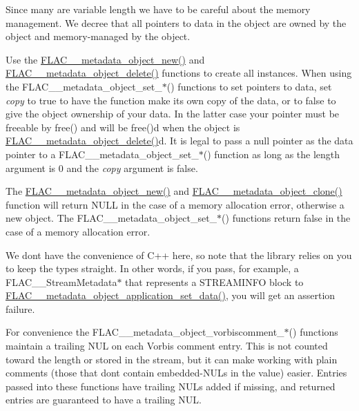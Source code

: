 Since many are variable length we have to be careful about the memory management. We decree that all pointers to data in the object are owned by the object and memory-\/managed by the object.

Use the \hyperlink{group__flac__metadata__object_ga0d21a62648d8c5321b4b47f8ee5a52f0}{F\+L\+A\+C\+\_\+\+\_\+metadata\+\_\+object\+\_\+new()} and \hyperlink{group__flac__metadata__object_ga66bbe27dba68ba77be5af83986a280ea}{F\+L\+A\+C\+\_\+\+\_\+metadata\+\_\+object\+\_\+delete()} functions to create all instances. When using the F\+L\+A\+C\+\_\+\+\_\+metadata\+\_\+object\+\_\+set\+\_\+$\ast$() functions to set pointers to data, set {\itshape copy} to {\ttfamily true} to have the function make it\textquotesingle{}s own copy of the data, or to {\ttfamily false} to give the object ownership of your data. In the latter case your pointer must be freeable by free() and will be free()d when the object is \hyperlink{group__flac__metadata__object_ga66bbe27dba68ba77be5af83986a280ea}{F\+L\+A\+C\+\_\+\+\_\+metadata\+\_\+object\+\_\+delete()}d. It is legal to pass a null pointer as the data pointer to a F\+L\+A\+C\+\_\+\+\_\+metadata\+\_\+object\+\_\+set\+\_\+$\ast$() function as long as the length argument is 0 and the {\itshape copy} argument is {\ttfamily false}.

The \hyperlink{group__flac__metadata__object_ga0d21a62648d8c5321b4b47f8ee5a52f0}{F\+L\+A\+C\+\_\+\+\_\+metadata\+\_\+object\+\_\+new()} and \hyperlink{group__flac__metadata__object_ga16b828b246e9af941e3e616e6bcd74c0}{F\+L\+A\+C\+\_\+\+\_\+metadata\+\_\+object\+\_\+clone()} function will return {\ttfamily N\+U\+LL} in the case of a memory allocation error, otherwise a new object. The F\+L\+A\+C\+\_\+\+\_\+metadata\+\_\+object\+\_\+set\+\_\+$\ast$() functions return {\ttfamily false} in the case of a memory allocation error.

We don\textquotesingle{}t have the convenience of C++ here, so note that the library relies on you to keep the types straight. In other words, if you pass, for example, a F\+L\+A\+C\+\_\+\+\_\+\+Stream\+Metadata$\ast$ that represents a S\+T\+R\+E\+A\+M\+I\+N\+FO block to \hyperlink{group__flac__metadata__object_ga8f7fbaa68d5637e2409a053ec2ff744d}{F\+L\+A\+C\+\_\+\+\_\+metadata\+\_\+object\+\_\+application\+\_\+set\+\_\+data()}, you will get an assertion failure.

For convenience the F\+L\+A\+C\+\_\+\+\_\+metadata\+\_\+object\+\_\+vorbiscomment\+\_\+$\ast$() functions maintain a trailing N\+UL on each Vorbis comment entry. This is not counted toward the length or stored in the stream, but it can make working with plain comments (those that don\textquotesingle{}t contain embedded-\/\+N\+U\+Ls in the value) easier. Entries passed into these functions have trailing N\+U\+Ls added if missing, and returned entries are guaranteed to have a trailing N\+UL.

